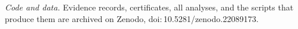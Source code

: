 \documentclass{ifacconf}
\begin{document}

\emph{Code and data.} Evidence records, certificates, all analyses, and the
scripts that produce them are archived on Zenodo,
\mbox{doi:\,10.5281/zenodo.22089173}.


\end{document}
